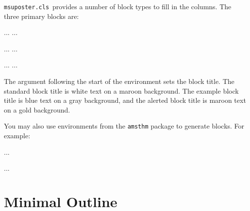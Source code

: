 \documentclass[11pt]{article}
\newcommand{\cls}{\lstinline[basicstyle=\ttfamily]!msuposter.cls!}
\newcommand{\code}[1]{\lstinline[basicstyle=\ttfamily]!#1!}
\begin{document}
\cls\ provides a number of block types to fill in the columns.  The three primary blocks are:
\begin{tex}
\begin{block}{...}         %
 ...
\end{block}

\begin{exampleblock}{...}  %
 ...
\end{exampleblock}

\begin{alertblock}{...}    %
 ...
\end{alertblock}
\end{tex}
The argument following the start of the environment sets the block title.  The standard block title is white text on a maroon background.  The example block title is blue text on a gray background, and the alerted block title is maroon text on a gold background.

You may also use environments from the \code{amsthm} package to generate blocks.  For example:
\begin{tex}
\begin{definition}[...]    %
...
\end{definition}

\begin{theorem}[...]       %
...
\end{theorem}
\end{tex}


\newpage
\section{Minimal Outline}
\end{document}
